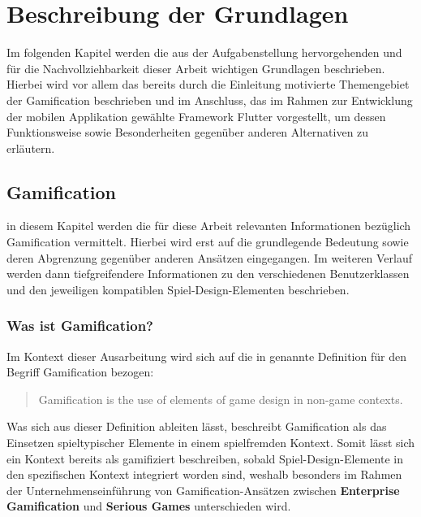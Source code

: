 \documentclass[bibliography=totoc,listof=totoc,BCOR=5mm,DIV=12,oneside]{scrbook}
\begin{document}
\newpage

\newpage
\chapter{Beschreibung der Grundlagen}
\label{chap:grundlagen}
\par Im folgenden Kapitel werden die aus der Aufgabenstellung hervorgehenden und für die Nachvollziehbarkeit dieser Arbeit wichtigen Grundlagen beschrieben. Hierbei wird vor allem das bereits durch die Einleitung motivierte Themengebiet der Gamification beschrieben und im Anschluss, das im Rahmen zur Entwicklung der mobilen Applikation gewählte Framework Flutter vorgestellt, um dessen Funktionsweise sowie Besonderheiten gegenüber anderen Alternativen zu erläutern.

\section{Gamification} 
\label{sec:grundlagenkapitelGamification}
\par in diesem Kapitel werden die für diese Arbeit relevanten Informationen bezüglich Gamification vermittelt. Hierbei wird erst auf die grundlegende Bedeutung sowie deren Abgrenzung gegenüber anderen Ansätzen eingegangen. Im weiteren Verlauf werden dann tiefgreifendere Informationen zu den verschiedenen Benutzerklassen und den jeweiligen kompatiblen Spiel-Design-Elementen beschrieben.

\subsection{Was ist Gamification?}
\par Im Kontext dieser Ausarbeitung wird sich auf die in \citep{deterding2011gamification} genannte Definition für den Begriff \grqq Gamification\grqq{} bezogen:
\begin{quotation} 
Gamification is the use of elements of game design in non-game contexts. 
\end{quotation}
\par Was sich aus dieser Definition ableiten lässt, beschreibt  Gamification als das Einsetzen spieltypischer Elemente in einem spielfremden Kontext. Somit lässt sich ein Kontext bereits als \grqq gamifiziert\grqq{}
beschreiben, sobald Spiel-Design-Elemente in den spezifischen Kontext integriert worden sind, weshalb besonders im Rahmen der Unternehmenseinführung von Gamification-Ansätzen zwischen \textbf{Enterprise Gamification} und \textbf{Serious Games} unterschieden wird. \citep[vgl. Kapitel 1.1 Gamification: Definition und Abgrenzung, Seite 4]{Sailer2016}
\end{document}
